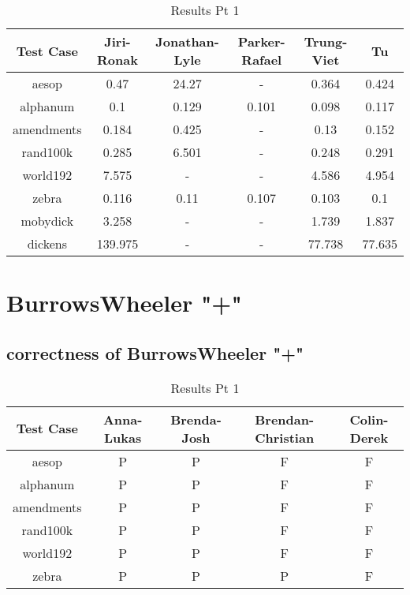 \documentclass[12pt]{article}
\begin{document}
\begin{table}[ht]
\caption{Results Pt 1}%
\centering %
\begin{tabular}{c c c c c c}%
\hline \hline                        %
Test Case & Jiri-Ronak & Jonathan-Lyle & Parker-Rafael & Trung-Viet & Tu \\ [0.5ex]%
\hline                  %
aesop & 0.47 & 24.27 & - & 0.364 & 0.424\\
alphanum & 0.1 & 0.129 & 0.101 & 0.098 & 0.117\\
amendments & 0.184 & 0.425 & - & 0.13 & 0.152 \\
rand100k & 0.285 & 6.501 & - & 0.248 & 0.291\\
world192 & 7.575 & - & - & 4.586 & 4.954\\
zebra & 0.116 & 0.11 & 0.107 & 0.103 & 0.1\\
mobydick & 3.258 & - & - & 1.739 & 1.837\\
dickens & 139.975 & - & - & 77.738 & 77.635\\
\hline                  %
\end{tabular}
\label{table:nonlin}
\end{table}





\newpage
\section{BurrowsWheeler "+"}
\subsection{correctness of BurrowsWheeler "+"}
\begin{table}[ht]
\caption{Results Pt 1}%
\centering %
\begin{tabular}{c c c c c}%
\hline \hline
Test Case & Anna-Lukas & Brenda-Josh & Brendan-Christian & Colin-Derek \\ [0.5ex]%
\hline                  %
aesop      & P & P & F & F \\
alphanum   & P & P & F & F \\
amendments & P & P & F & F \\
rand100k   & P & P & F & F \\
world192   & P & P & F & F \\
zebra      & P & P & P & F \\
\hline                  %
\end{tabular}
\label{table:nonlin}
\end{table}
\end{document}
